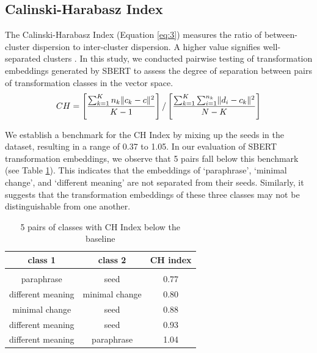 \documentclass[11pt]{article}
\begin{document}
\subsection{Calinski-Harabasz Index}

The Calinski-Harabasz Index (Equation \ref{eq:3}) measures the ratio of between-cluster dispersion to inter-cluster dispersion. A higher value signifies well-separated clusters \cite{calinski1974dendrite}. In this study, we conducted pairwise testing of transformation embeddings generated by SBERT to assess the degree of separation between pairs of transformation classes in the vector space.
\begin{equation}
\label{eq:3}
  \scriptsize CH =\left[  {\frac {\sum_{k=1}^{K} n_k  \lVert c_k - c \rVert ^2}{K-1} }\right] /
 \left[ \frac{\sum_{k=1}^{K} \sum_{i=1}^{n_k}  \lVert d_i -c_k  \rVert ^2 }{N-K} \right] 
\end{equation}

We establish a benchmark for the CH Index by mixing up the seeds in the dataset, resulting in a range of 0.37 to 1.05. In our evaluation of SBERT transformation embeddings, we observe that 5 pairs fall below this benchmark (see Table \ref{CH_worst}). This indicates that the embeddings of `paraphrase', `minimal change', and `different meaning' are not separated from their seeds. Similarly, it suggests that the transformation embeddings of these three classes may not be distinguishable from one another.

\begin{table}[!htp]
\centering
\begin{tabular}{c c c}
\toprule
\vspace{0.1cm}
\textbf{class 1} &\textbf{class 2} &\textbf{CH index} \vspace{0.15cm}\\ 
 \hline \\[-1.7ex]
\vspace{0.1cm}paraphrase	& 	seed		& 0.77\\
\vspace{0.1cm}different meaning		&minimal change	&	0.80\\
\vspace{0.1cm}minimal change		&seed	& 0.88\\
\vspace{0.1cm}different meaning	&	seed	&	0.93\\
\vspace{0.1cm}different meaning	&	paraphrase	&	1.04\\
\toprule
\end{tabular}
\caption{5 pairs of classes with CH Index below the baseline}
\label{CH_worst}
\end{table}
\end{document}
